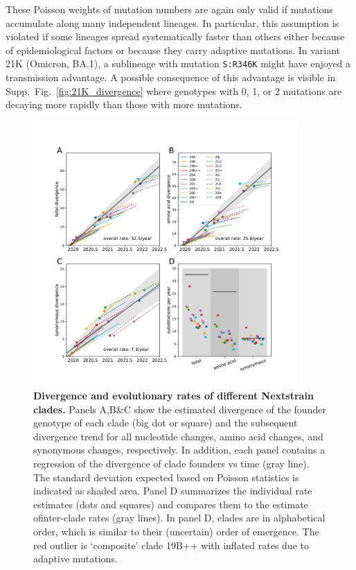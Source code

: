\documentclass[aps,rmp, twocolumn]{revtex4}
\begin{document}
These Poisson weights of mutation numbers are again only valid if mutations accumulate along many independent lineages.
In particular, this assumption is violated if some lineages spread systematically faster than others either because of epidemiological factors or because they carry adaptive mutations.
In variant 21K (Omicron, BA.1), a sublineage with mutation \texttt{S:R346K} might have enjoyed a transmission advantage.
A possible consequence of this advantage is visible in Supp.~Fig.~\ref{fig:21K_divergence} where genotypes with 0, 1, or 2 mutations are decaying more rapidly than those with more mutations.

\begin{figure}
    \includegraphics[width=0.9\textwidth]{figures/rate_summary.pdf}
    \caption[]{{\bf Divergence and evolutionary rates of different Nextstrain clades.} Panels A,B\&C show the estimated divergence of the founder genotype of each clade (big dot or square) and the subsequent divergence trend for all nucleotide changes, amino acid changes, and synonymous changes, respectively.
    In addition, each panel contains a regression of the divergence of clade founders vs time (gray line).
    The standard deviation expected based on Poisson statistics is indicated as shaded area.
    Panel D summarizes the individual rate estimates (dots and squares) and compares them to the estimate ofinter-clade rates (gray lines).
    In panel D, clades are in alphabetical order, which is similar to their (uncertain) order of emergence.
    The red outlier is `composite' clade 19B++ with inflated rates due to adaptive mutations.
    \label{fig:rate_summary} }
\end{figure}
\end{document}
